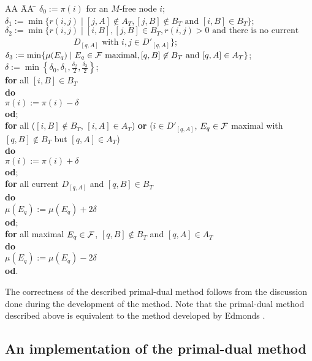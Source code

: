 \documentclass[12pt,twoside,a4paper]{article}
\begin{document}
\begin{tabbing}
AA \= AA \= \kill
$\delta_0 := \pi(i)$ for an $M$-free node $i$; \\
$\delta_1 := \min\{r(i,j) \mid [j,A] \not\in A_T, [j,B] \not\in B_T \mbox{ and } [i,B] \in B_T\}$;\\
$\delta_2 := \min\{r(i,j)  \mid [i,B],[j,B] \in B_T, r(i,j) > 0 \mbox{ and there is no current}$   \\
 $\qquad \qquad \qquad \qquad D_{[q,A]} \mbox{ with } i,j \in D'_{[q,A]}\}$; \\
$\delta_3 := \min\{\mu(E_q) \mid E_q \in {\cal F} \mbox{ maximal}, [q,B] \not\in B_T 
\mbox{ and } [q,A] \in A_T\}$; \\
$\delta := \min \left\{\delta_0, \delta_1, \frac{\delta_2}{2}, \frac{\delta_3}{2}\right\}$; \\
{\bf for} all $[i,B] \in B_T$ \\
\> {\bf do} \\
\> \> $\pi(i) := \pi(i) - \delta$ \\
\> {\bf od}; \\ 
{\bf for} all ($[i,B] \not\in B_T$, $[i,A] \in A_T$) {\bf or} ($i \in D'_{[q,A]}$, $E_q \in \cal F$ 
maximal with \\
\> \> \qquad \qquad \qquad \qquad \qquad \qquad $[q,B] \not\in B_T$ but $[q,A] \in A_T$) \\
\> {\bf do} \\
\> \> $\pi(i) := \pi(i) + \delta$ \\
\> {\bf od}; \\ 
{\bf for} all current $D_{[q,A]}$ and $[q,B] \in B_T$ \\
\> {\bf do} \\
\> \> $\mu(E_q) := \mu(E_q) + 2\delta$ \\
\> {\bf od}; \\
{\bf for} all maximal $E_q \in \cal F$, $[q,B] \not\in B_T$ and $[q,A] \in A_T$ \\
\> {\bf do} \\
\> \> $\mu(E_q) := \mu(E_q) - 2\delta$ \\
\> {\bf od}.
\end{tabbing}

The correctness of the described primal-dual method follows from the 
discussion done during the development of the method. Note that the primal-dual method described 
above is equivalent to the method developed by Edmonds \cite{Ed2}.

\subsection{An implementation of the primal-dual method}
\end{document}

